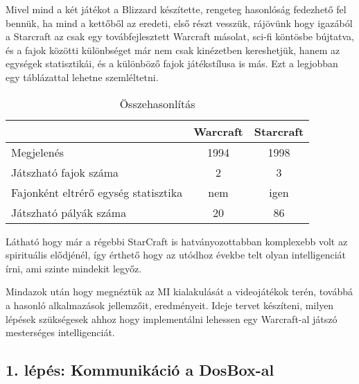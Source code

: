 Mivel mind a két játékot a Blizzard készítette, rengeteg hasonlóság fedezhető fel bennük, ha mind a kettőből az eredeti, első részt vesszük, rájövünk hogy igazából a Starcraft az csak egy továbfejlesztett Warcraft másolat, sci-fi köntösbe bújtatva, és a fajok közötti különbséget már nem csak kinézetben kereshetjük, hanem az egységek statisztikái, és a különböző fajok játékstílusa is más. Ezt a legjobban egy táblázattal lehetne szemléltetni.
\begin{table}[h]
    \centering
    \caption{Összehasonlítás}
    \label{tab:osszehasonlitas}
    \begin{tabular}{l|c|c|}
    ~ & Warcraft & Starcraft \\
    \hline
    Megjelenés & 1994 & 1998 \\
    Játszható fajok száma & 2 & 3 \\
    Fajonként eltrérő egység statisztika & nem & igen \\
    Játszható pályák száma & 20 & 86 \\
    \hline
    \end{tabular}
\end{table}

Látható hogy már a régebbi StarCraft is hatványozottabban komplexebb volt az spirituális elődjénél, így érthető hogy az utódhoz évekbe telt olyan intelligenciát írni, ami szinte mindekit legyőz.


Mindazok után hogy megnéztük az MI kialakulását a videojátékok terén, továbbá a hasonló alkalmazások jellemzőit, eredményeit. Ideje tervet készíteni, milyen lépések szükségesek ahhoz hogy implementálni lehessen egy Warcraft-al játszó mesterséges intelligenciát.

\subsection{1. lépés: Kommunikáció a DosBox-al}

